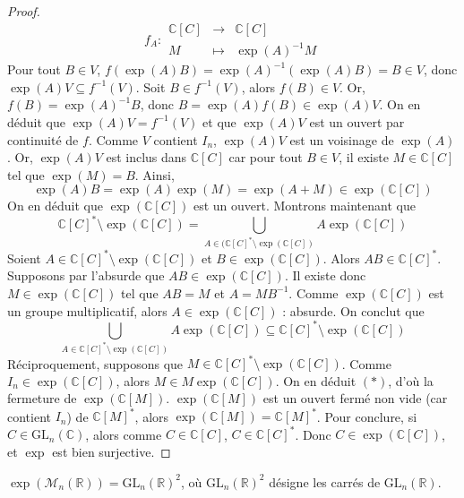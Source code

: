\begin{proof}
		\[
			f_A :
			\begin{array}{ccc}
				\mathbb{C}[C] &\rightarrow& \mathbb{C}[C] \\
				M &\mapsto& \exp(A)^{-1}M
			\end{array}
		\]
		Pour tout $B \in V$, $f(\exp(A)B) = \exp(A)^{-1}(\exp(A)B) = B \in V$, donc $\exp(A)V \subseteq f^{-1}(V)$. Soit $B \in f^{-1}(V)$, alors $f(B) \in V$. Or, $f(B) = \exp(A)^{-1}B$, donc $B = \exp(A)f(B) \in \exp(A)V$. On en déduit que $\exp(A)V = f^{-1}(V)$ et que $\exp(A)V$ est un ouvert par continuité de $f$. Comme $V$ contient $I_n$, $\exp(A)V$ est un voisinage de $\exp(A)$. Or, $\exp(A)V$ est inclus dans $\mathbb{C}[C]$ car pour tout $B \in V$, il existe $M \in \mathbb{C}[C]$ tel que $\exp(M)=B$. Ainsi,
		\[ \exp(A)B = \exp(A)\exp(M) = \exp(A+M) \in \exp(\mathbb{C}[C]) \]
		On en déduit que $\exp(\mathbb{C}[C])$ est un ouvert.
		\newpar
		Montrons maintenant que
		\[ \mathbb{C}[C]^* \setminus \exp(\mathbb{C}[C]) = \bigcup_{A \in (\mathbb{C}[C]^* \setminus \exp(\mathbb{C}[C])} A\exp(\mathbb{C}[C]) \tag{$(*)$} \]
		Soient $A \in \mathbb{C}[C]^* \setminus \exp(\mathbb{C}[C])$ et $B \in \exp(\mathbb{C}[C])$. Alors $AB \in \mathbb{C}[C]^*$. Supposons par l'absurde que $AB \in \exp(\mathbb{C}[C])$. Il existe donc $M \in \exp(\mathbb{C}[C])$ tel que $AB = M$ et $A=MB^{-1}$. Comme $\exp(\mathbb{C}[C])$ est un groupe multiplicatif, alors $A \in \exp(\mathbb{C}[C])$ : absurde. On conclut que
		\[ \bigcup_{A \in \mathbb{C}[C]^* \setminus \exp(\mathbb{C}[C])} A\exp(\mathbb{C}[C]) \subseteq \mathbb{C}[C]^* \setminus \exp(\mathbb{C}[C]) \]
		Réciproquement, supposons que $M \in \mathbb{C}[C]^* \setminus \exp(\mathbb{C}[C])$. Comme $I_n \in \exp(\mathbb{C}[C])$, alors $M \in M\exp(\mathbb{C}[C])$. On en déduit $(*)$, d'où la fermeture de $\exp(\mathbb{C}[M])$.
		\newpar
		$\exp(\mathbb{C}[M])$ est un ouvert fermé non vide (car contient $I_n$) de $\mathbb{C}[M]^*$, alors $\exp(\mathbb{C}[M]) = \mathbb{C}[M]^*$. Pour conclure, si $C \in \mathrm{GL}_n(\mathbb{C})$, alors comme $C \in \mathbb{C}[C]$, $C \in \mathbb{C}[C]^*$. Donc $C \in \exp(\mathbb{C}[C])$, et $\exp$ est bien surjective.
	\end{proof}
	
	\begin{application}
		$\exp(\mathcal{M}_n(\mathbb{R})) = \mathrm{GL}_n(\mathbb{R})^2$, où $\mathrm{GL}_n(\mathbb{R})^2$ désigne les carrés de $\mathrm{GL}_n(\mathbb{R})$.
	\end{application}
	
